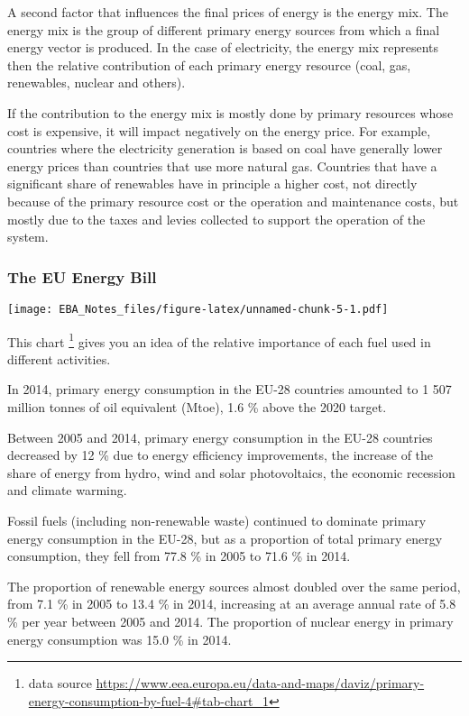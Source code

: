 \documentclass[]{book}
\let\rmarkdownfootnote\footnote%
\def\footnote{\protect\rmarkdownfootnote}
\theoremstyle{definition}
\theoremstyle{definition}
\theoremstyle{definition}
\theoremstyle{remark}
\begin{document}
A second factor that influences the final prices of energy is the energy
mix. The energy mix is the group of different primary energy sources
from which a final energy vector is produced. In the case of
electricity, the energy mix represents then the relative contribution of
each primary energy resource (coal, gas, renewables, nuclear and
others).

If the contribution to the energy mix is mostly done by primary
resources whose cost is expensive, it will impact negatively on the
energy price. For example, countries where the electricity generation is
based on coal have generally lower energy prices than countries that use
more natural gas. Countries that have a significant share of renewables
have in principle a higher cost, not directly because of the primary
resource cost or the operation and maintenance costs, but mostly due to
the taxes and levies collected to support the operation of the system.

\subsubsection{The EU Energy Bill}\label{the-eu-energy-bill}

\texttt{[image: EBA\_Notes\_files/figure-latex/unnamed-chunk-5-1.pdf]}

This chart \footnote{data source
  \url{https://www.eea.europa.eu/data-and-maps/daviz/primary-energy-consumption-by-fuel-4\#tab-chart_1}}
gives you an idea of the relative importance of each fuel used in
different activities.

In 2014, primary energy consumption in the EU-28 countries amounted to 1
507 million tonnes of oil equivalent (Mtoe), 1.6 \% above the 2020
target.

Between 2005 and 2014, primary energy consumption in the EU-28 countries
decreased by 12 \% due to energy efficiency improvements, the increase
of the share of energy from hydro, wind and solar photovoltaics, the
economic recession and climate warming.

Fossil fuels (including non-renewable waste) continued to dominate
primary energy consumption in the EU-28, but as a proportion of total
primary energy consumption, they fell from 77.8 \% in 2005 to 71.6 \% in
2014.

The proportion of renewable energy sources almost doubled over the same
period, from 7.1 \% in 2005 to 13.4 \% in 2014, increasing at an average
annual rate of 5.8 \% per year between 2005 and 2014. The proportion of
nuclear energy in primary energy consumption was 15.0 \% in 2014.
\end{document}
